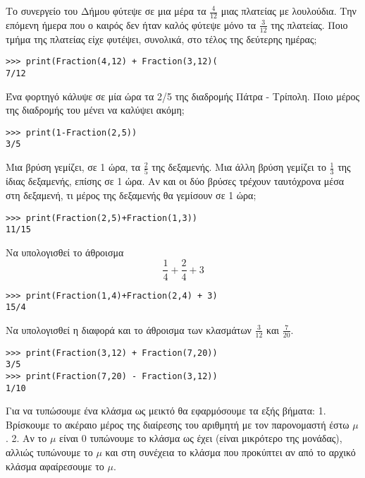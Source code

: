 \begin{exercise} Το συνεργείο του Δήμου φύτεψε σε μια μέρα τα $\frac{4}{12}$ μιας πλατείας με λουλούδια. Την επόμενη ήμερα που ο καιρός δεν ήταν καλός φύτεψε μόνο τα $\frac{3}{12}$ της πλατείας. Ποιο τμήμα της πλατείας είχε φυτέψει, συνολικά, στο τέλος της δεύτερης ημέρας;
\end{exercise}

\begin{lstlisting}
>>> print(Fraction(4,12) + Fraction(3,12)(
7/12
\end{lstlisting}

\begin{exercise}Ένα φορτηγό κάλυψε σε μία ώρα τα 2/5 της διαδρομής Πάτρα - Τρίπολη. Ποιο μέρος της διαδρομής του μένει να καλύψει ακόμη;\end{exercise}

\begin{lstlisting}
>>> print(1-Fraction(2,5))
3/5
\end{lstlisting}

\begin{exercise}Μια βρύση γεμίζει, σε 1 ώρα, τα $\frac{2}{5}$ της δεξαμενής. Μια άλλη βρύση γεμίζει το $\frac{1}{3}$ της ίδιας δεξαμενής, επίσης σε 1 ώρα. Αν και οι δύο βρύσες τρέχουν ταυτόχρονα μέσα στη δεξαμενή, τι μέρος της δεξαμενής θα γεμίσουν σε 1 ώρα;
\end{exercise}

\begin{lstlisting}
>>> print(Fraction(2,5)+Fraction(1,3))
11/15
\end{lstlisting}

\begin{exercise}Να υπολογισθεί το άθροισμα 
$$\frac{1}{4}+\frac{2}{4} + 3$$
\end{exercise}

\begin{lstlisting}
>>> print(Fraction(1,4)+Fraction(2,4) + 3)
15/4
\end{lstlisting}

\begin{exercise}Να υπολογισθεί η διαφορά και το άθροισμα των κλασμάτων
$\frac{3}{12}$ και $\frac{7}{20}$.
\end{exercise}

\begin{lstlisting}
>>> print(Fraction(3,12) + Fraction(7,20))
3/5
>>> print(Fraction(7,20) - Fraction(3,12))
1/10
\end{lstlisting}

Για να τυπώσουμε ένα κλάσμα ως μεικτό θα εφαρμόσουμε τα εξής βήματα:
1. Βρίσκουμε το ακέραιο μέρος της διαίρεσης του αριθμητή με τον παρονομαστή έστω $\mu$.
2. Αν το $\mu$ είναι 0 τυπώνουμε το κλάσμα ως έχει (είναι μικρότερο της μονάδας), αλλιώς τυπώνουμε το $\mu$ και στη συνέχεια το κλάσμα που προκύπτει αν από το αρχικό κλάσμα αφαίρεσουμε το $\mu$.


